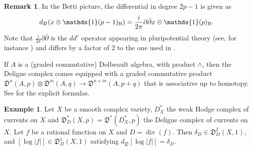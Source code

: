 \documentclass[11pt,a4paper]{amsart}
\newcommand{\Betti}{\text{\rm B}}
\newcommand{\fD}{\mathfrak{D}}
\newcommand{\bfone}{{\mathds{1}}}
\DeclareMathOperator {\Div}{div}
\numberwithin{equation}{section}
\theoremstyle{plain}
\theoremstyle{definition}
\newtheorem{rmk}[prop]{Remark}
\newtheorem{ex}[prop]{Example}
\begin{document}
  \begin{rmk}
    In the Betti picture, the differential in degree $2p-1$ is given
    as
    \begin{displaymath}
      d_{\fD}(x\otimes \bfone(p-1)_{\Betti})=\frac{i}{2\pi }\partial\bar
      \partial x\otimes \bfone(p)_{\Betti}.
    \end{displaymath}
    Note that $\frac{i}{2\pi }\partial\bar \partial$ is the $dd^{c}$
    operator appearing in pluripotential theory (see, for instance
    \cite{Demailly:cadg} ) and differs by a factor of 2 to the one
    used in \cite{GilletSoule:ait}.
  \end{rmk}

  If $A$ is a (graded commutative) Dolbeault algebra, with product $\wedge$, then the Deligne complex comes equipped with a
  graded commutative product $\fD^{n}(A,p)\otimes \fD^{m}(A,q)\to
  \fD^{n+m}(A,p+q)$ that is associative up to homotopy. See \cite[Thm.\,3.3]{Burgos:CDB} 
  for the explicit formulas.

  \begin{ex}\label{exm:10} 
    Let $X$ be a smooth complex variety, $D_{X}^{\ast}$ the weak Hodge
    complex of currents on $X$ and
    $\fD_{D}^{\ast}(X,p)=\fD^{\ast}(D^{\ast}_{X},p)$ the Deligne
    complex of currents on $X$. Let $f$ be a rational function on $X$
    and $D=\Div(f)$. Then $\delta _{D}\in \fD_{D}^{2}(X,1)$, and
    $[\log |f|]\in \fD_{D}^{1}(X,1)$ satisfying $d_{\fD}[\log |f|]=\delta
    _{D}$.   
  \end{ex}

  
\end{document}
